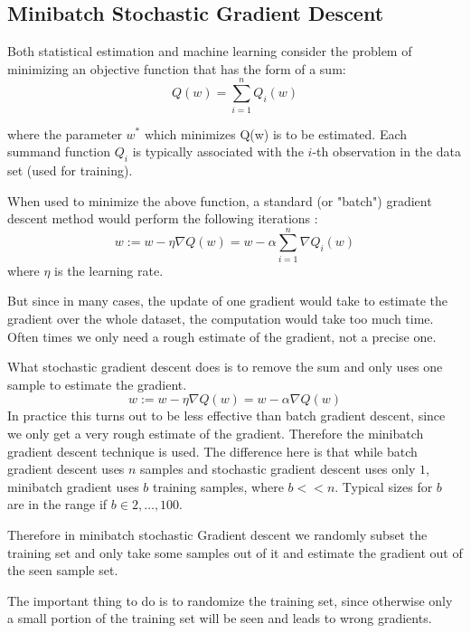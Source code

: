 \documentclass{acm_proc_article-sp}
\begin{document}
\subsection{Minibatch Stochastic Gradient Descent}

Both statistical estimation and machine learning consider the problem of minimizing an objective function that has the form of a sum:
\begin{equation}
Q(w) = \sum_{i=1}^n Q_i(w)
\end{equation}

where the parameter $w^*$ which minimizes Q(w) is to be estimated. Each summand function $Q_i$ is typically associated with the $i$-th observation in the data set (used for training).

When used to minimize the above function, a standard (or "batch") gradient descent method would perform the following iterations :
\begin{equation}
w := w - \eta \nabla Q(w) = w - \alpha \sum_{i=1}^n \nabla Q_i(w)
\end{equation}
where $\eta$ is the learning rate.

But since in many cases, the update of one gradient would take to estimate the gradient over the whole dataset, the computation would take too much time. Often times we only need a rough estimate of the gradient, not a precise one.

What stochastic gradient descent does is to remove the sum and only uses one sample to estimate the gradient.
\begin{equation}
w := w - \eta \nabla Q(w) = w - \alpha \nabla Q(w)
\end{equation}
In practice this turns out to be less effective than batch gradient descent, since we only get a very rough estimate of the gradient.
Therefore the minibatch gradient descent technique is used. The difference here is that while batch gradient descent uses $n$ samples and stochastic gradient descent uses only $1$, minibatch gradient uses $b$ training samples, where $b << n$. Typical sizes for $b$ are in the range if $b \in {2,\ldots,100}$.

Therefore in minibatch stochastic Gradient descent we randomly subset the training set and only take some samples out of it and estimate the gradient out of the seen sample set.

The important thing to do is to randomize the training set, since otherwise only a small portion of the training set will be seen and leads to wrong gradients.
\end{document}
